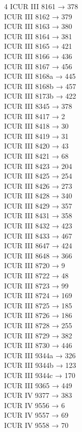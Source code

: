 \begin{multicols}{4}
ICUR III 8161 → 378\\
ICUR III 8162 → 379\\
ICUR III 8163 → 380\\
ICUR III 8164 → 381\\
ICUR III 8165 → 421\\
ICUR III 8166 → 436\\
ICUR III 8167 → 456\\
ICUR III 8168a → 445\\
ICUR III 8168b → 457\\
ICUR III 8173b → 422\\
ICUR III 8345 → 378\\
ICUR III 8417 → 2\\
ICUR III 8418 → 30\\
ICUR III 8419 → 31\\
ICUR III 8420 → 43\\
ICUR III 8421 → 68\\
ICUR III 8423 → 204\\
ICUR III 8425 → 254\\
ICUR III 8426 → 273\\
ICUR III 8428 → 340\\
ICUR III 8429 → 357\\
ICUR III 8431 → 358\\
ICUR III 8432 → 423\\
ICUR III 8433 → 467\\
ICUR III 8647 → 424\\
ICUR III 8648 → 366\\
ICUR III 8720 → 9\\
ICUR III 8722 → 48\\
ICUR III 8723 → 99\\
ICUR III 8724 → 169\\
ICUR III 8725 → 185\\
ICUR III 8726 → 186\\
ICUR III 8728 → 255\\
ICUR III 8729 → 382\\
ICUR III 8730 → 446\\
ICUR III 9344a → 326\\
ICUR III 9344b → 123\\
ICUR III 9344c → 170\\
ICUR III 9365 → 449\\
ICUR IV 9377 → 383\\
ICUR IV 9556 → 6\\
ICUR IV 9557 → 69\\
ICUR IV 9558 → 70\\

\end{multicols}
